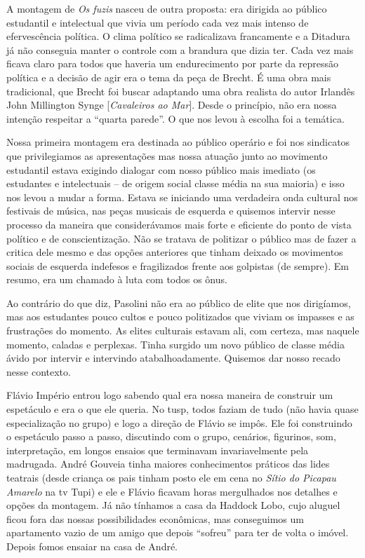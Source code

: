\subject{Montagem dos Fuzis de Tereza Carrar}

A montagem de {\it Os fuzis} nasceu de outra proposta: era dirigida ao
público estudantil e intelectual que vivia um período cada vez mais
intenso de efervescência política. O clima político se radicalizava
francamente e a Ditadura já não conseguia manter o controle com a
brandura que dizia ter. Cada vez mais ficava claro para todos que
haveria um endurecimento por parte da repressão política e a decisão de
agir era o tema da peça de Brecht. É uma obra mais tradicional, que
Brecht foi buscar adaptando uma obra realista do autor Irlandês John
Millington Synge {[}{\it Cavaleiros ao Mar}{]}. Desde o princípio, não
era nossa intenção respeitar a “quarta parede”. O que nos levou à
escolha foi a temática.

Nossa primeira montagem era destinada ao público operário e foi nos
sindicatos que privilegiamos as apresentações mas nossa atuação junto ao
movimento estudantil estava exigindo dialogar com nosso público mais
imediato (os estudantes e intelectuais -- de origem social classe média
na sua maioria) e isso nos levou a mudar a forma. Estava se iniciando
uma verdadeira onda cultural nos festivais de música, nas peças musicais
de esquerda e quisemos intervir nesse processo da maneira que
considerávamos mais forte e eficiente do ponto de vista político e de
conscientização. Não se tratava de politizar o público mas de fazer a
critica dele mesmo e das opções anteriores que tinham deixado os
movimentos sociais de esquerda indefesos e fragilizados frente aos
golpistas (de sempre). Em resumo, era um chamado à luta com todos os
ônus.

Ao contrário do que diz, Pasolini não era ao público de elite que nos
dirigíamos, mas aos estudantes pouco cultos e pouco politizados que
viviam os impasses e as frustrações do momento. As elites culturais
estavam ali, com certeza, mas naquele momento, caladas e perplexas.
Tinha surgido um novo público de classe média ávido por intervir e
intervindo atabalhoadamente. Quisemos dar nosso recado nesse contexto.

Flávio Império entrou logo sabendo qual era nossa maneira de construir
um espetáculo e era o que ele queria. No {\sc tusp}, todos faziam de tudo (não
havia quase especialização no grupo) e logo a direção de Flávio se
impôs. Ele foi construindo o espetáculo passo a passo, discutindo com o
grupo, cenários, figurinos, som, interpretação, em longos ensaios que
terminavam invariavelmente pela madrugada. André Gouveia tinha maiores
conhecimentos práticos das lides teatrais (desde criança os pais tinham
posto ele em cena no {\it Sítio do Picapau Amarelo} na {\sc tv} Tupi) e ele e
Flávio ficavam horas mergulhados nos detalhes e opções da montagem. Já
não tínhamos a casa da Haddock Lobo, cujo aluguel ficou fora das nossas
possibilidades econômicas, mas conseguimos um apartamento vazio de um
amigo que depois “sofreu” para ter de volta o imóvel. Depois fomos
ensaiar na casa de André.

